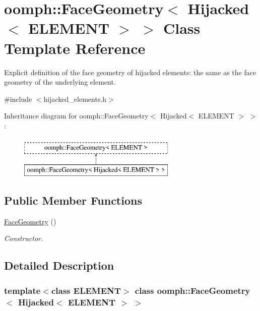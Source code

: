 \hypertarget{classoomph_1_1FaceGeometry_3_01Hijacked_3_01ELEMENT_01_4_01_4}{}\section{oomph\+:\+:Face\+Geometry$<$ Hijacked$<$ E\+L\+E\+M\+E\+NT $>$ $>$ Class Template Reference}
\label{classoomph_1_1FaceGeometry_3_01Hijacked_3_01ELEMENT_01_4_01_4}


Explicit definition of the face geometry of hijacked elements\+: the same as the face geometry of the underlying element.  




{\ttfamily \#include $<$hijacked\+\_\+elements.\+h$>$}

Inheritance diagram for oomph\+:\+:Face\+Geometry$<$ Hijacked$<$ E\+L\+E\+M\+E\+NT $>$ $>$\+:\begin{figure}[H]
\begin{center}
\leavevmode
\includegraphics[height=2.000000cm]{classoomph_1_1FaceGeometry_3_01Hijacked_3_01ELEMENT_01_4_01_4}
\end{center}
\end{figure}
\subsection*{Public Member Functions}
\begin{DoxyCompactItemize}
\item 
\hyperlink{classoomph_1_1FaceGeometry_3_01Hijacked_3_01ELEMENT_01_4_01_4_aa15ca241abd8d8c44efffac9b710a13f}{Face\+Geometry} ()
\begin{DoxyCompactList}\small\item\em Constructor. \end{DoxyCompactList}\end{DoxyCompactItemize}


\subsection{Detailed Description}
\subsubsection*{template$<$class E\+L\+E\+M\+E\+NT$>$\newline
class oomph\+::\+Face\+Geometry$<$ Hijacked$<$ E\+L\+E\+M\+E\+N\+T $>$ $>$}

